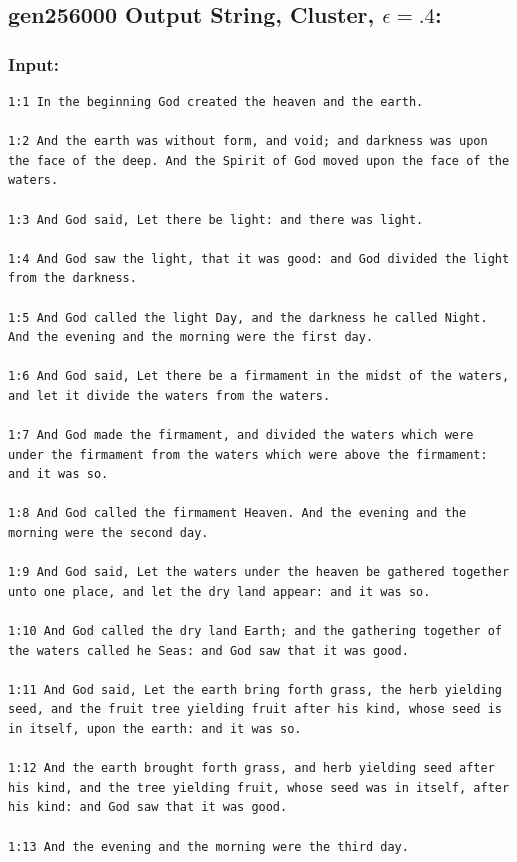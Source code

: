 \documentclass[11pt]{article}
\begin{document}
\pagebreak

\subsection*{gen256000 Output String, Cluster, $\epsilon=.4$:}

\subsubsection*{Input:}


\begin{lstlisting}
1:1 In the beginning God created the heaven and the earth.

1:2 And the earth was without form, and void; and darkness was upon
the face of the deep. And the Spirit of God moved upon the face of the
waters.

1:3 And God said, Let there be light: and there was light.

1:4 And God saw the light, that it was good: and God divided the light
from the darkness.

1:5 And God called the light Day, and the darkness he called Night.
And the evening and the morning were the first day.

1:6 And God said, Let there be a firmament in the midst of the waters,
and let it divide the waters from the waters.

1:7 And God made the firmament, and divided the waters which were
under the firmament from the waters which were above the firmament:
and it was so.

1:8 And God called the firmament Heaven. And the evening and the
morning were the second day.

1:9 And God said, Let the waters under the heaven be gathered together
unto one place, and let the dry land appear: and it was so.

1:10 And God called the dry land Earth; and the gathering together of
the waters called he Seas: and God saw that it was good.

1:11 And God said, Let the earth bring forth grass, the herb yielding
seed, and the fruit tree yielding fruit after his kind, whose seed is
in itself, upon the earth: and it was so.

1:12 And the earth brought forth grass, and herb yielding seed after
his kind, and the tree yielding fruit, whose seed was in itself, after
his kind: and God saw that it was good.

1:13 And the evening and the morning were the third day.


\end{lstlisting}
\end{document}
